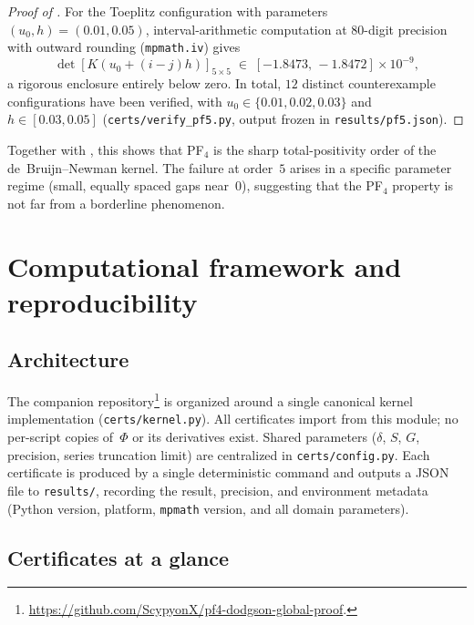 \documentclass[11pt,a4paper]{amsart}
\theoremstyle{definition}
\theoremstyle{remark}
\begin{document}
\begin{proof}[Proof of ]
For the Toeplitz configuration with parameters
$(u_0, h) = (0.01, 0.05)$,
interval-arithmetic computation at $80$-digit precision with
outward rounding (\texttt{mpmath.iv}) gives
\[
  \det[K(u_0 + (i-j)h)]_{5\times 5}
  \;\in\; [-1.8473,\, -1.8472] \times 10^{-9},
\]
a rigorous enclosure entirely below zero.
In total, $12$ distinct counterexample configurations have been
verified, with $u_0 \in \{0.01, 0.02, 0.03\}$ and
$h \in [0.03, 0.05]$
(\texttt{certs/verify\_pf5.py}, output frozen in
\texttt{results/pf5.json}).
\end{proof}

Together with , this shows that PF$_4$ is
the sharp total-positivity order of the de~Bruijn--Newman kernel.
The failure at order~$5$ arises in a specific parameter regime
(small, equally spaced gaps near~$0$),
suggesting that the PF$_4$ property is not far from a borderline
phenomenon.


\section{Computational framework and reproducibility}\label{sec:comp}

\subsection{Architecture}

The companion repository\footnote{%
  \url{https://github.com/ScypyonX/pf4-dodgson-global-proof}.}
is organized around a single canonical kernel implementation
(\texttt{certs/kernel.py}).
All certificates import from this module; no per-script copies
of~$\Phi$ or its derivatives exist.
Shared parameters ($\delta$, $S$, $G$, precision, series truncation
limit) are centralized in \texttt{certs/config.py}.
Each certificate is produced by a single deterministic command
and outputs a JSON file to \texttt{results/}, recording the
result, precision, and environment metadata (Python version,
platform, \texttt{mpmath} version, and all domain parameters).

\subsection{Certificates at a glance}
\end{document}

